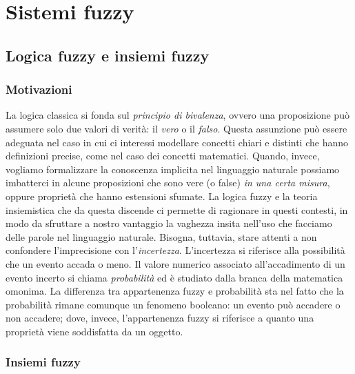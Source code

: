 \documentclass[10pt,a4paper]{article}
\begin{document}
\section{Sistemi fuzzy}

\subsection{Logica fuzzy e insiemi fuzzy}

\subsubsection{Motivazioni}

La logica classica si fonda sul \emph{principio di bivalenza}, ovvero una proposizione può assumere solo due valori di verità: il \emph{vero} o il \emph{falso}. Questa assunzione può essere adeguata nel caso in cui ci interessi modellare concetti chiari e distinti che hanno definizioni precise, come nel caso dei concetti matematici. Quando, invece, vogliamo formalizzare la conoscenza implicita nel linguaggio naturale possiamo imbatterci in alcune proposizioni che sono vere (o false) \emph{in una certa misura}, oppure proprietà che hanno estensioni sfumate. La logica fuzzy e la teoria insiemistica che da questa discende ci permette di ragionare in questi contesti, in modo da sfruttare a nostro vantaggio la vaghezza insita nell'uso che facciamo delle parole nel linguaggio naturale. Bisogna, tuttavia, stare attenti a non confondere l'imprecisione con l'\emph{incertezza}. L'incertezza si riferisce alla possibilità che un evento accada o meno. Il valore numerico associato all'accadimento di un evento incerto si chiama \emph{probabilità} ed è studiato dalla branca della matematica omonima. La differenza tra appartenenza fuzzy e probabilità sta nel fatto che la probabilità rimane comunque un fenomeno booleano: un evento può accadere o non accadere; dove, invece, l'appartenenza fuzzy si riferisce a quanto una proprietà viene soddisfatta da un oggetto. 

\subsubsection{Insiemi fuzzy}
\end{document}
